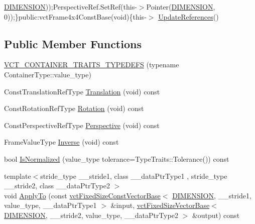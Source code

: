 \begin{DoxyCompactItemize}
\hyperlink{classvct_frame4x4_const_base_aa9000d4539e9ab27b091692d4bd0d986a97d7212e6c46dc9acbbd11bbc573d9a0}{D\+I\+M\+E\+N\+S\+I\+O\+N}));Perspective\+Ref.\+Set\+Ref(this-\/$>$Pointer(\hyperlink{classvct_frame4x4_const_base_aa9000d4539e9ab27b091692d4bd0d986a97d7212e6c46dc9acbbd11bbc573d9a0}{D\+I\+M\+E\+N\+S\+I\+O\+N}, 0));\}public\+:vct\+Frame4x4\+Const\+Base(void)\{this-\/$>$ \hyperlink{classvct_frame4x4_const_base_aabe7499444284102317fe1af3a3f6978}{Update\+References}()
\end{DoxyCompactItemize}
\subsection*{Public Member Functions}
\begin{DoxyCompactItemize}
\item 
\hyperlink{classvct_frame4x4_const_base_aef998797a8d07436b67568f729539103}{V\+C\+T\+\_\+\+C\+O\+N\+T\+A\+I\+N\+E\+R\+\_\+\+T\+R\+A\+I\+T\+S\+\_\+\+T\+Y\+P\+E\+D\+E\+F\+S} (typename Container\+Type\+::value\+\_\+type)
\item 
Const\+Translation\+Ref\+Type \hyperlink{classvct_frame4x4_const_base_a81571b849bb769466e39dddd510b2628}{Translation} (void) const 
\item 
Const\+Rotation\+Ref\+Type \hyperlink{classvct_frame4x4_const_base_aae75fc595135c7d3aa8945144cedd91e}{Rotation} (void) const 
\item 
Const\+Perspective\+Ref\+Type \hyperlink{classvct_frame4x4_const_base_a2b3da139fde5f2cfbc4ae4ddbdefcebc}{Perspective} (void) const 
\item 
Frame\+Value\+Type \hyperlink{classvct_frame4x4_const_base_ad4b9f70a24ed1a5e693a66bd149df0da}{Inverse} (void) const 
\item 
bool \hyperlink{classvct_frame4x4_const_base_afff3495048bde408d23103a78c551d6b}{Is\+Normalized} (value\+\_\+type tolerance=Type\+Traits\+::\+Tolerance()) const 
\item 
{\footnotesize template$<$stride\+\_\+type \+\_\+\+\_\+stride1, class \+\_\+\+\_\+data\+Ptr\+Type1 , stride\+\_\+type \+\_\+\+\_\+stride2, class \+\_\+\+\_\+data\+Ptr\+Type2 $>$ }\\void \hyperlink{classvct_frame4x4_const_base_a146079e4a58d048afe35208ed7f85273}{Apply\+To} (const \hyperlink{classvct_fixed_size_const_vector_base}{vct\+Fixed\+Size\+Const\+Vector\+Base}$<$ \hyperlink{classvct_frame4x4_const_base_aa9000d4539e9ab27b091692d4bd0d986a97d7212e6c46dc9acbbd11bbc573d9a0}{D\+I\+M\+E\+N\+S\+I\+O\+N}, \+\_\+\+\_\+stride1, value\+\_\+type, \+\_\+\+\_\+data\+Ptr\+Type1 $>$ \&input, \hyperlink{classvct_fixed_size_vector_base}{vct\+Fixed\+Size\+Vector\+Base}$<$ \hyperlink{classvct_frame4x4_const_base_aa9000d4539e9ab27b091692d4bd0d986a97d7212e6c46dc9acbbd11bbc573d9a0}{D\+I\+M\+E\+N\+S\+I\+O\+N}, \+\_\+\+\_\+stride2, value\+\_\+type, \+\_\+\+\_\+data\+Ptr\+Type2 $>$ \&output) const 

\end{DoxyCompactItemize}
